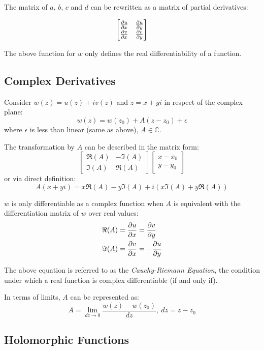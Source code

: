\documentclass[12pt]{article}
\begin{document}
	The matrix of $a$, $b$, $c$ and $d$ can be rewritten as a matrix of partial derivatives:
	
	\begin{equation*}
		\begin{bmatrix}
			\frac{\partial u}{\partial x} & \frac{\partial u}{\partial y} \\
			\frac{\partial v}{\partial x} & \frac{\partial v}{\partial y}
		\end{bmatrix}
	\end{equation*}
	
	The above function for $w$ only defines the real differentiability of a function.
	
	\subsection{Complex Derivatives}
	
	Consider $w(z) = u(z) + iv(z)$ and $z = x + yi$ in respect of the complex plane: $$w(z) = w(z_0) + A(z - z_0) + \epsilon$$
	where $\epsilon$ is less than linear (same as above), $A \in \mathbb{C}$.
	
	The transformation by $A$ can be described in the matrix form:
	\begin{equation*}
		\begin{bmatrix}
			\Re(A) & -\Im(A) \\ \Im(A) & \Re(A)
		\end{bmatrix}
		\begin{bmatrix}
			x - x_0 \\ y - y_0
		\end{bmatrix}
	\end{equation*}
	or via direct definition: $$A(x + yi) = x\Re(A) - y\Im(A) + i(x\Im(A) +y\Re(A))$$
	
	$w$ is only differentiable as a complex function when $A$ is equivalent with the differentiation matrix of $w$ over real values:
	\begin{align*}
		\Re(A) &= \frac{\partial u}{\partial x} = \frac{\partial v}{\partial y} \\
		\Im(A) &= \frac{\partial v}{\partial x} = -\frac{\partial u}{\partial y}
	\end{align*}
	
	The above equation is referred to as the \textit{Cauchy-Riemann Equation}, the condition under which a real function is complex differentiable (if and only if).
	
	In terms of limits, $A$ can be represented as: $$A = \lim_{dz \to 0} \frac{w(z) - w(z_0)}{dz},\ dz = z-z_0$$
	
	\subsection{Holomorphic Functions}
	
\end{document}
